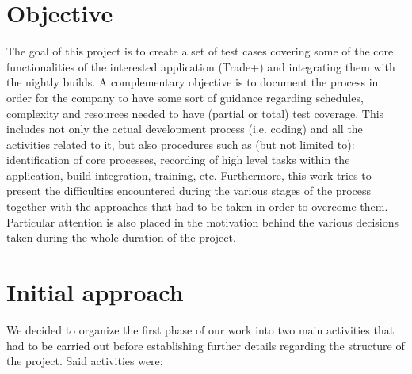 \section{Objective} 

The goal of this project is to create a set of test cases covering some of the core functionalities of the interested application (Trade+) and integrating them with the nightly builds. A complementary objective is to document the process in order for the company to have some sort of guidance regarding schedules, complexity and resources needed to have (partial or total) test coverage. 
This includes not only the actual development process (i.e. coding) and all the activities related to it, but also procedures such as (but not limited to): identification of core processes, recording of high level tasks within the application, build integration, training, etc. 
Furthermore, this work tries to present the difficulties encountered during the various stages of the process together with the approaches that had to be taken in order to overcome them. Particular attention is also placed in the motivation behind the various decisions taken during the whole duration of the project.

\section{Initial approach}

We decided to organize the first phase of our work into two main activities that had to be carried out before establishing further details regarding the structure of the project. Said activities were:

